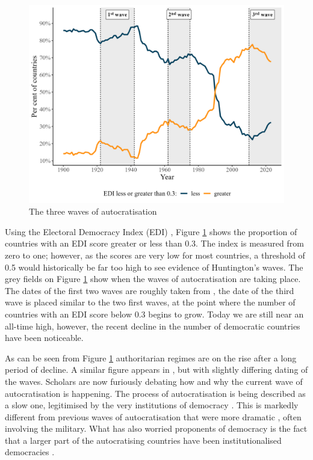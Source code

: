 \begin{figure}[hbt!]
\centering
\includegraphics[width = \textwidth]{waves.jpeg}
\caption{\label{fig:autocratisation}The three waves of autocratisation}
\end{figure}

Using the Electoral Democracy Index (EDI) \citep{coppedge_v-dem_2025}, Figure \ref{fig:autocratisation} shows the proportion of countries with an EDI score greater or less than 0.3. The index is measured from zero to one; however, as the scores are very low for most countries, a threshold of 0.5 would historically be far too high to see evidence of Huntington's waves. The grey fields on Figure \ref{fig:autocratisation} show when the waves of autocratisation are taking place. The dates of the first two waves are roughly taken from \citet[p.16]{huntington_third_1991} , the date of the third wave is placed similar to the two first waves, at the point where the number of countries with an EDI score below 0.3 begins to grow. Today we are still near an all-time high, however, the recent decline in the number of democratic countries have been noticeable. 

As can be seen from Figure \ref{fig:autocratisation} authoritarian regimes are on the rise after a long period of decline. A similar figure appears in \citet{luhrmann_third_2019}, but with slightly differing dating of the waves. Scholars are now furiously debating how and why the current wave of autocratisation is happening. The process of autocratisation is being described as a slow one, legitimised by the very institutions of democracy \citep{varol_stealth_2015, bermeo_democratic_2016, luhrmann_third_2019}. This is markedly different from previous waves of autocratisation that were more dramatic \citep[pp. 6-8]{bermeo_democratic_2016}, often involving the military. What has also worried proponents of democracy is the fact that a larger part of the autocratising countries have been institutionalised democracies \citep{luhrmann_third_2019}. 

